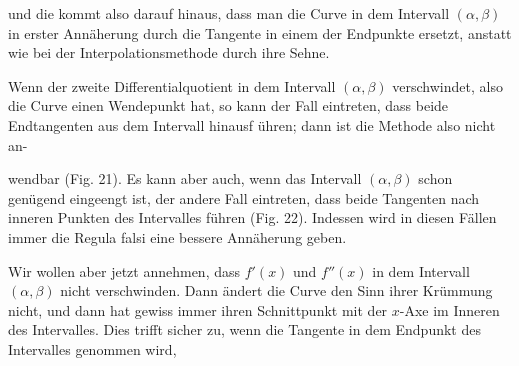 
und die  kommt also darauf
hinaus, dass man die Curve in dem Intervall $(\alpha, \beta)$ in erster
Ann\"aherung durch die Tangente in einem der Endpunkte ersetzt,
anstatt wie bei der Interpolationsmethode durch ihre Sehne.


Wenn der zweite Differentialquotient in dem Intervall $(\alpha, \beta)$
verschwindet, also die Curve einen Wendepunkt hat, so kann der
Fall eintreten, dass beide Endtangenten aus dem Intervall hinausf
\"uhren; dann ist die  Methode also nicht an-


wendbar (Fig. 21). Es kann aber auch, wenn das Intervall $(\alpha, \beta)$
schon gen\"ugend eingeengt ist, der andere Fall eintreten, dass
beide Tangenten nach inneren Punkten des Intervalles f\"uhren
(Fig. 22). Indessen wird in diesen F\"allen immer die Regula
falsi eine bessere Ann\"aherung geben.

Wir wollen aber jetzt annehmen, dass $f'(x)$ und $f''(x)$ in
dem Intervall $(\alpha, \beta)$ nicht verschwinden. Dann \"andert die Curve
den Sinn ihrer Kr\"ummung nicht, und dann hat gewiss immer
 ihren Schnittpunkt mit der
$x$-Axe im Inneren des Intervalles. Dies trifft sicher zu, wenn
die Tangente in dem Endpunkt des Intervalles genommen wird,

